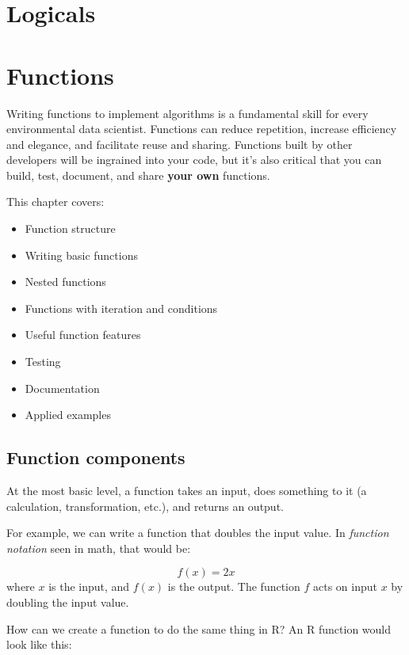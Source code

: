 \documentclass[
]{book}
\providecommand{\tightlist}{%
  \setlength{\itemsep}{0pt}\setlength{\parskip}{0pt}}
\begin{document}
\hypertarget{logicals}{%
\chapter{Logicals}\label{logicals}}

\hypertarget{functions}{%
\chapter{Functions}\label{functions}}

Writing functions to implement algorithms is a fundamental skill for every environmental data scientist. Functions can reduce repetition, increase efficiency and elegance, and facilitate reuse and sharing. Functions built by other developers will be ingrained into your code, but it's also critical that you can build, test, document, and share \textbf{your own} functions.

This chapter covers:

\begin{itemize}
\tightlist
\item
  Function structure
\item
  Writing basic functions
\item
  Nested functions
\item
  Functions with iteration and conditions
\item
  Useful function features
\item
  Testing
\item
  Documentation
\item
  Applied examples
\end{itemize}

\hypertarget{function-components}{%
\section{Function components}\label{function-components}}

At the most basic level, a function takes an input, does something to it (a calculation, transformation, etc.), and returns an output.

For example, we can write a function that doubles the input value. In \emph{function notation} seen in math, that would be:

\[f(x) = 2x\]
where \(x\) is the input, and \(f(x)\) is the output. The function \(f\) acts on input \(x\) by doubling the input value.

How can we create a function to do the same thing in R? An R function would look like this:
\end{document}

